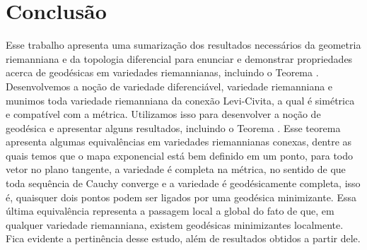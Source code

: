 \chapter{Conclusão}
\label{cap:conclusao}

Esse trabalho apresenta uma sumarização dos resultados necessários da geometria riemanniana e da topologia diferencial para enunciar e demonstrar propriedades acerca de geodésicas em variedades riemannianas, incluindo o Teorema . Desenvolvemos a noção de variedade diferenciável, variedade riemanniana e munimos toda variedade riemanniana da conexão Levi-Civita, a qual é simétrica e compatível com a métrica. Utilizamos isso para desenvolver a noção de geodésica e apresentar alguns resultados, incluindo o Teorema . Esse teorema apresenta algumas equivalências em variedades riemannianas conexas, dentre as quais temos que o mapa exponencial está bem definido em um ponto, para todo vetor no plano tangente, a variedade é completa na métrica, no sentido de que toda sequência de Cauchy converge e a variedade é geodésicamente completa, isso é, quaisquer dois pontos podem ser ligados por uma geodésica minimizante. Essa última equivalência representa a passagem local a global do fato de que, em qualquer variedade riemanniana, existem geodésicas minimizantes localmente. Fica evidente a pertinência desse estudo, além de resultados obtidos a partir dele.
